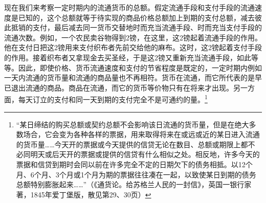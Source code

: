 \documentclass{ctexbook}
\begin{document}
        现在我们来考察一定时期内的流通货币的总额。假定流通手段和支付手段的流通速度是已知的，这个总额就等于待实现的商品价格总额加上到期的支付总额，减去彼此抵销的支付，最后减去同一货币交替地时而充当流通手段、时而充当支付手段的流通次数。例如，一个农民卖谷物得到2镑，在这里，这2镑起着流通手段的作用。他在支付日把这2镑用来支付织布者先前交给他的麻布。这时，这2镑起着支付手段的作用。接着织布者又拿现金去买圣经，于是这2镑又重新充当流通手段，如此等等。因此，即使价格、货币流通速度和支付的节省程度是既定的，一定时期内例如一天内流通的货币量和流通的商品量也不再相符。货币在流通，而它所代表的是早已退出流通的商品。商品在流通，而它的货币等价物只有在将来才出现。另一方面，每天订立的支付和同一天到期的支付完全不是可通约的量。\footnote{“某日缔结的购买总额或契约总额不会影响该日流通的货币量，但是在绝大多数场合，它会变为各种各样的票据，用来取得将来在或远或近的某日进入流通的货币量……今天开的票据或今天提供的信贷无论在数目、总额或期限上都不必同明天或后天开的票据或提供的信贷有什么相似之处。相反地，许多今天的票据和信贷到期时会同以前在许多完全不定的日期欠下的债务相抵。以12个月、6个月、3个月或1个月为期的票据往往凑在一起，以致使某日到期的债务总额特别膨胀起来……”（《通货论。给苏格兰人民的一封信》，英国一银行家著，1845年爱丁堡版，散见第29、30页）}
\end{document}
